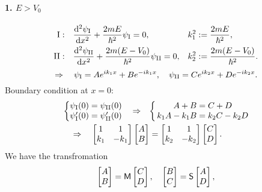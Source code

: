 \documentclass{article}
\def\d{{\rm d}}
\newcommand{\sds}[2]{\frac{\d^2 #1}{\d #2^2}}
\begin{document}
\paragraph{1. $E>V_0$}
\begin{align*}
	{\rm I:}  & \quad\sds{\psi_{\rm I}}x+\frac{2mE}{\hbar^2}\psi_{\rm I}=0,         & k_1^2 & :=\frac{2mE}{\hbar^2},       \\
	{\rm II:} & \quad\sds{\psi_{\rm II}}x+\frac{2m(E-V_0)}{\hbar^2}\psi_{\rm II}=0, & k_2^2 & :=\frac{2m(E-V_0)}{\hbar^2}.
\end{align*}
$$\Rightarrow\quad\psi_{\rm I}=Ae^{ik_1x}+Be^{-ik_1x},\quad\psi_{\rm II}=Ce^{ik_2x}+De^{-ik_2x}.$$
Boundary condition at $x=0$:
\begin{gather*}
	\left\{
	\begin{matrix}
		\psi_{\rm I}(0)=\psi_{\rm II}(0) \\
		\psi_{\rm I}'(0)=\psi_{\rm II}'(0)
	\end{matrix}
	\quad\Rightarrow\quad\right\{
	\begin{matrix}
		A+B=C+D \\
		k_1A-k_1B=k_2C-k_2D
	\end{matrix}\\
	\Rightarrow\quad
	\begin{bmatrix}1&1\\k_1&-k_1\end{bmatrix}
	\begin{bmatrix}A\\B\end{bmatrix}=
	\begin{bmatrix}1&1\\k_2&-k_2\end{bmatrix}
	\begin{bmatrix}C\\D\end{bmatrix}.\quad\quad
\end{gather*}
We have the transfromation
\begin{align*}
	\begin{bmatrix}A\\B\end{bmatrix}=\mathsf M\begin{bmatrix}C\\D\end{bmatrix},\quad
	\begin{bmatrix}B\\C\end{bmatrix}=\mathsf S\begin{bmatrix}A\\D\end{bmatrix},
\end{align*}
\end{document}
